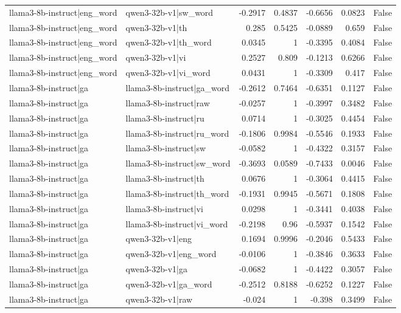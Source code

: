 \begin{table}
\begin{tabular}{l l r r r r l}
llama3-8b-instruct|eng_word & qwen3-32b-v1|sw_word & -0.2917 & 0.4837 & -0.6656 & 0.0823 & False \\
llama3-8b-instruct|eng_word & qwen3-32b-v1|th & 0.285 & 0.5425 & -0.0889 & 0.659 & False \\
llama3-8b-instruct|eng_word & qwen3-32b-v1|th_word & 0.0345 & 1 & -0.3395 & 0.4084 & False \\
llama3-8b-instruct|eng_word & qwen3-32b-v1|vi & 0.2527 & 0.809 & -0.1213 & 0.6266 & False \\
llama3-8b-instruct|eng_word & qwen3-32b-v1|vi_word & 0.0431 & 1 & -0.3309 & 0.417 & False \\
llama3-8b-instruct|ga & llama3-8b-instruct|ga_word & -0.2612 & 0.7464 & -0.6351 & 0.1127 & False \\
llama3-8b-instruct|ga & llama3-8b-instruct|raw & -0.0257 & 1 & -0.3997 & 0.3482 & False \\
llama3-8b-instruct|ga & llama3-8b-instruct|ru & 0.0714 & 1 & -0.3025 & 0.4454 & False \\
llama3-8b-instruct|ga & llama3-8b-instruct|ru_word & -0.1806 & 0.9984 & -0.5546 & 0.1933 & False \\
llama3-8b-instruct|ga & llama3-8b-instruct|sw & -0.0582 & 1 & -0.4322 & 0.3157 & False \\
llama3-8b-instruct|ga & llama3-8b-instruct|sw_word & -0.3693 & 0.0589 & -0.7433 & 0.0046 & False \\
llama3-8b-instruct|ga & llama3-8b-instruct|th & 0.0676 & 1 & -0.3064 & 0.4415 & False \\
llama3-8b-instruct|ga & llama3-8b-instruct|th_word & -0.1931 & 0.9945 & -0.5671 & 0.1808 & False \\
llama3-8b-instruct|ga & llama3-8b-instruct|vi & 0.0298 & 1 & -0.3441 & 0.4038 & False \\
llama3-8b-instruct|ga & llama3-8b-instruct|vi_word & -0.2198 & 0.96 & -0.5937 & 0.1542 & False \\
llama3-8b-instruct|ga & qwen3-32b-v1|eng & 0.1694 & 0.9996 & -0.2046 & 0.5433 & False \\
llama3-8b-instruct|ga & qwen3-32b-v1|eng_word & -0.0106 & 1 & -0.3846 & 0.3633 & False \\
llama3-8b-instruct|ga & qwen3-32b-v1|ga & -0.0682 & 1 & -0.4422 & 0.3057 & False \\
llama3-8b-instruct|ga & qwen3-32b-v1|ga_word & -0.2512 & 0.8188 & -0.6252 & 0.1227 & False \\
llama3-8b-instruct|ga & qwen3-32b-v1|raw & -0.024 & 1 & -0.398 & 0.3499 & False \\

\end{tabular}
\end{table}

